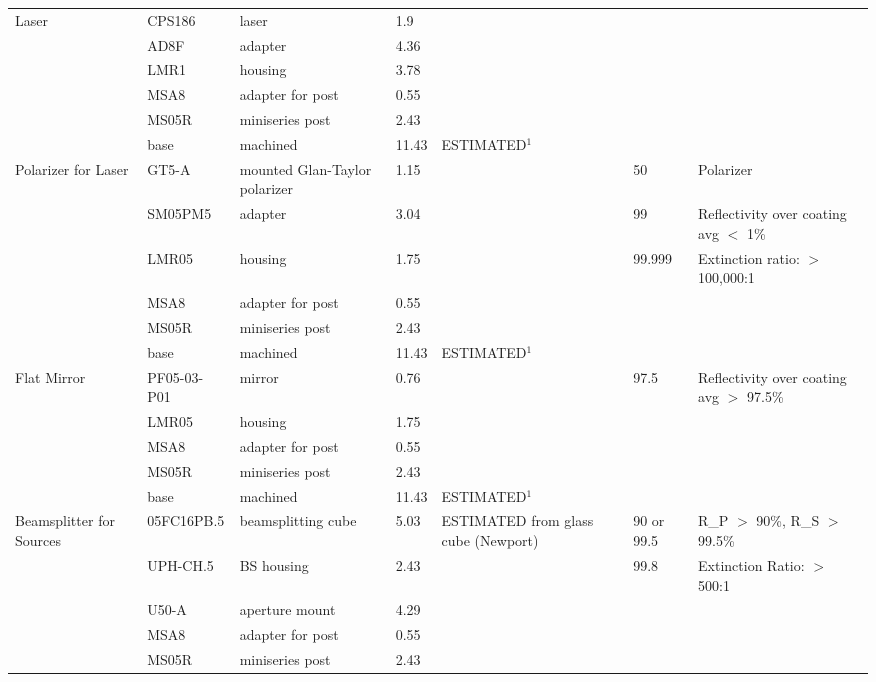 \documentclass[12pt]{article}
\begin{document}
\begin{landscape}
\begin{center}
\begin{longtable}{| p{3.25cm} | p{2.2cm} | p{3cm} | p{1.75cm} | p{2.5cm} | p{1.55cm} | p{5cm} |}
    \multirow{5}{*}{Laser} & CPS186 & laser & 1.9   &       &       &  \\ 
          & AD8F  & adapter & 4.36  &       &       &  \\
          & LMR1  & housing & 3.78  &       &       &  \\
          & MSA8  & adapter for post & 0.55  &       &       &  \\
          & MS05R & miniseries post & 2.43  &       &       &  \\
          & base  & machined & 11.43 & ESTIMATED$^1$  &       &  \\ \hline
    \multirow{6}{*}{\parbox{3.25cm}{Polarizer for Laser}} & GT5-A & mounted Glan-Taylor polarizer & 1.15  &       & 50    & Polarizer \\ 
          & SM05PM5 & adapter & 3.04  &       & 99    & Reflectivity over coating avg $<$ 1\% \\
          & LMR05 & housing & 1.75  &       & 99.999 & Extinction ratio: $>$ 100,000:1 \\
          & MSA8  & adapter for post & 0.55  &       &       &  \\
          & MS05R & miniseries post & 2.43  &       &       &  \\
          & base  & machined & 11.43 & ESTIMATED$^1$ &       &  \\ \hline
    \multirow{5}{*}{Flat Mirror} & PF05-03-P01 & mirror & 0.76  &       & 97.5  & Reflectivity over coating avg $>$ 97.5\% \\ 
          & LMR05 & housing & 1.75  &       &       &  \\
          & MSA8  & adapter for post & 0.55  &       &       &  \\
          & MS05R & miniseries post & 2.43  &       &       &  \\
          & base  & machined & 11.43 & ESTIMATED$^1$ &       &  \\ \hline
    \multirow{6}{*}{\parbox{3.25cm}{Beamsplitter for Sources}} & 05FC16PB.5 & beamsplitting cube & 5.03  & ESTIMATED from glass cube (Newport) & 90 or 99.5 & R\_P $>$ 90\%, R\_S $>$ 99.5\% \\ 
          & UPH-CH.5 & BS housing & 2.43  &       & 99.8  & Extinction Ratio: $>$ 500:1 \\
          & U50-A & aperture mount & 4.29  &       &       &  \\
          & MSA8  & adapter for post & 0.55  &       &       &  \\
          & MS05R & miniseries post & 2.43  &       &       &  \\

\end{longtable}
\end{center}
\end{landscape}
\end{document}

